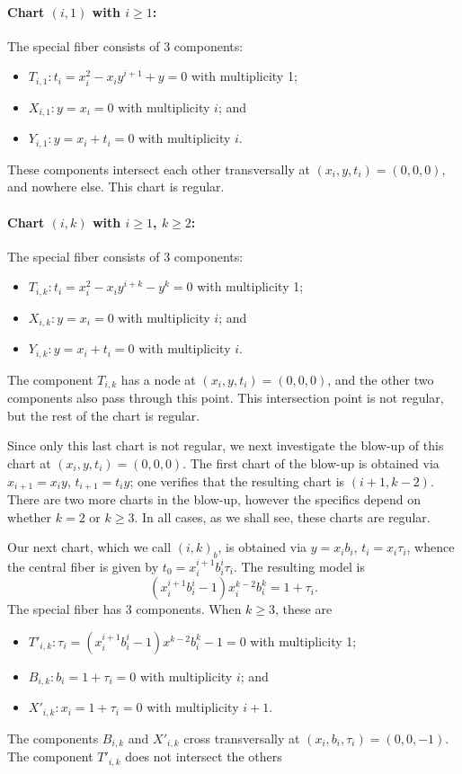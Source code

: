 \documentclass[pagesize,paper=letter]{scrartcl}
\theoremstyle{plain}
\theoremstyle{definition}
\theoremstyle{remark}
\begin{document}
\paragraph{Chart $(i, 1)$ with $i \geq 1$:}
\label{sec:case-i-1}

The special fiber consists of 3 components:
\begin{itemize}
    \item $T_{i,1}: t_i = x_i^2 - x_iy^{i+1} + y = 0$ with multiplicity 1;
    \item $X_{i,1}: y = x_i = 0$ with multiplicity $i$; and
    \item $Y_{i,1}: y = x_i + t_i = 0$ with multiplicity $i$.
\end{itemize}
These components intersect each other transversally at $(x_i, y, t_i) = (0,0,0)$, and nowhere else. This chart is regular.



\paragraph{Chart $(i, k)$ with $i\geq 1$, $k\geq 2$:}
\label{sec:higher-i-k}

The special fiber consists of 3 components:
\begin{itemize}
    \item $T_{i,k}: t_i = x_i^2 - x_iy^{i+k} - y^k = 0$ with multiplicity 1;
    \item $X_{i,k}: y = x_i = 0$ with multiplicity $i$; and
    \item $Y_{i,k}: y = x_i + t_i = 0$ with multiplicity $i$.
\end{itemize}
The component $T_{i,k}$ has a node at $(x_i,y,t_i) = (0,0,0)$, and the other two components also pass through this point. This intersection point is not regular, but the rest of the chart is regular.

Since only this last chart is not regular, we next investigate the blow-up of this chart at $(x_i,y,t_i) = (0,0,0)$. The first chart of the blow-up is obtained via $x_{i+1} = x_i y$, $t_{i+1} = t_i y$; one verifies that the resulting chart is $(i+1, k-2)$. There are two more charts in the blow-up, however the specifics depend on whether $k=2$ or $k \geq 3$. In all cases, as we shall see, these charts are regular.

Our next chart, which we call $(i,k)_b$, is obtained via $y = x_ib_i$, $t_i = x_i\tau_i$, whence the central fiber is given by $t_0 = x_i^{i+1}b_i^i\tau_i$. The resulting model is
\[
(x_i^{i+1}b_i^i - 1)x_i^{k-2} b_i^k = 1 + \tau_i.
\]
The special fiber has 3 components. When $k \geq 3$, these are
\begin{itemize}
    \item $T'_{i,k}: \tau_i = (x_i^{i+1}b_i^i - 1)x^{k-2} b_i^k - 1 = 0$ with multiplicity 1;
    \item $B_{i,k}: b_i = 1+\tau_i = 0$ with multiplicity $i$; and
    \item $X'_{i,k}: x_i = 1+\tau_i = 0$ with multiplicity $i+1$.
\end{itemize}
The components $B_{i,k}$ and $X'_{i,k}$ cross transversally at $(x_i, b_i, \tau_i) = (0, 0, -1)$. The component $T'_{i,k}$ does not intersect the others
\end{document}
